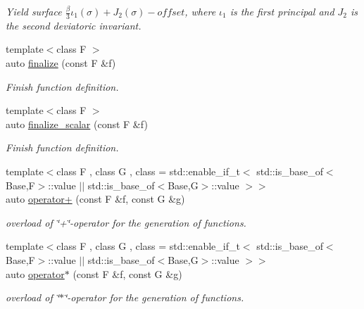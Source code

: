 \begin{DoxyCompactItemize}
\begin{DoxyCompactList}\small\item\em Yield surface $ \frac{\beta}{3}\iota_1(\sigma) + J_2(\sigma)-offset $, where $\iota_1$ is the first principal and $J_2$ is the second deviatoric invariant. \end{DoxyCompactList}\item 
{\footnotesize template$<$class F $>$ }\\auto \hyperlink{namespaceFunG_a3a2af76439713dc7635e0c538ac34f15}{finalize} (const F \&f)
\begin{DoxyCompactList}\small\item\em Finish function definition. \end{DoxyCompactList}\item 
{\footnotesize template$<$class F $>$ }\\auto \hyperlink{namespaceFunG_a0c224cd9b212427657c6798ac8adf6ac}{finalize\-\_\-scalar} (const F \&f)
\begin{DoxyCompactList}\small\item\em Finish function definition. \end{DoxyCompactList}\item 
{\footnotesize template$<$class F , class G , class  = std\-::enable\-\_\-if\-\_\-t$<$ std\-::is\-\_\-base\-\_\-of$<$\-Base,\-F$>$\-::value $\vert$$\vert$                                      std\-::is\-\_\-base\-\_\-of$<$\-Base,\-G$>$\-::value $>$$>$ }\\auto \hyperlink{namespaceFunG_ac7f61d48ff610ec4be8ee6994d165077}{operator+} (const F \&f, const G \&g)
\begin{DoxyCompactList}\small\item\em overload of \char`\"{}+\char`\"{}-\/operator for the generation of functions. \end{DoxyCompactList}\item 
{\footnotesize template$<$class F , class G , class  = std\-::enable\-\_\-if\-\_\-t$<$ std\-::is\-\_\-base\-\_\-of$<$\-Base,\-F$>$\-::value $\vert$$\vert$ std\-::is\-\_\-base\-\_\-of$<$\-Base,\-G$>$\-::value $>$$>$ }\\auto \hyperlink{namespaceFunG_a014be932d3b4eb377d8e60271e864438}{operator$\ast$} (const F \&f, const G \&g)
\begin{DoxyCompactList}\small\item\em overload of \char`\"{}$\ast$\char`\"{}-\/operator for the generation of functions. \end{DoxyCompactList}\item 

\end{DoxyCompactItemize}
